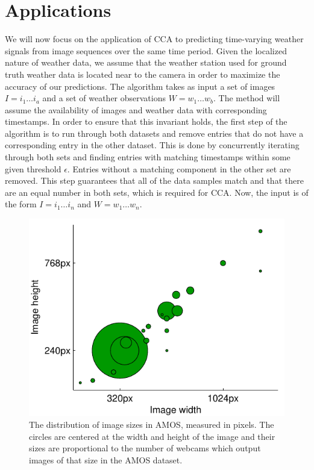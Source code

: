 \section{Applications}
We will now focus on the application of CCA to predicting time-varying weather signals from image sequences over the same time period. Given the localized nature of weather data, we assume that the weather station used for ground truth weather data is located near to the camera in order to maximize the accuracy of our predictions. The algorithm takes as input a set of images $I=i_1\ldots i_a$ and a set of weather observations $W=w_1\ldots w_b$. The method will assume the availability of images and weather data with corresponding timestamps. In order to ensure that this invariant holds, the first step of the algorithm is to run through both datasets and remove entries that do not have a corresponding entry in the other dataset. This is done by concurrently iterating through both sets and finding entries with matching timestamps within some given threshold $\epsilon$. Entries without a matching component in the other set are removed. This step guarantees that all of the data samples match and that there are an equal number in both sets, which is required for CCA. Now, the input is of the form $I=i_1\ldots i_n$ and $W=w_1\ldots w_n$.

\begin{figure}
	\centering
		\includegraphics{figures/imagedimensions.pdf}
	\caption[The distribution of image sizes in AMOS, measured in pixels]{The distribution of image sizes in AMOS, measured in pixels. The circles are centered at the width and height of the image and their sizes are proportional to the number of webcams which output images of that size in the AMOS dataset.}
	\label{fig:imagedimensions}
\end{figure}

